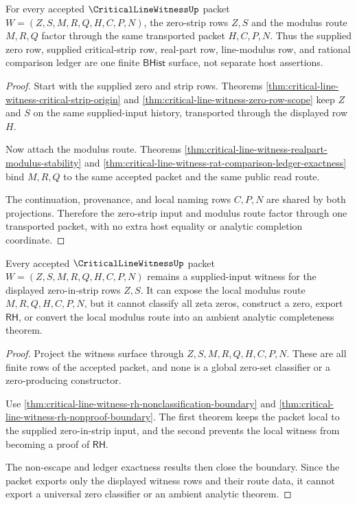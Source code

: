 \begin{theorem}
\label{thm:critical-line-witness-strip-modulus-route-factorization}
For every accepted $\CriticalLineWitnessUp$ packet $W=(Z,S,M,R,Q,H,C,P,N)$,
the zero-strip rows $Z,S$ and the modulus route $M,R,Q$ factor through the
same transported packet $H,C,P,N$. Thus the supplied zero row, supplied
critical-strip row, real-part row, line-modulus row, and rational comparison
ledger are one finite $\mathsf{BHist}$ surface, not separate host assertions.
\end{theorem}
\begin{proof}
Start with the supplied zero and strip rows. Theorems
\autoref{thm:critical-line-witness-critical-strip-origin} and
\autoref{thm:critical-line-witness-zero-row-scope} keep $Z$ and $S$ on the
same supplied-input history, transported through the displayed row $H$.

Now attach the modulus route. Theorems
\autoref{thm:critical-line-witness-realpart-modulus-stability} and
\autoref{thm:critical-line-witness-rat-comparison-ledger-exactness} bind
$M,R,Q$ to the same accepted packet and the same public read route.

The continuation, provenance, and local naming rows $C,P,N$ are shared by
both projections. Therefore the zero-strip input and modulus route factor
through one transported packet, with no extra host equality or analytic
completion coordinate.
\end{proof}

\begin{theorem}
\label{thm:critical-line-witness-local-rh-boundary}
Every accepted $\CriticalLineWitnessUp$ packet $W=(Z,S,M,R,Q,H,C,P,N)$ remains
a supplied-input witness for the displayed zero-in-strip rows $Z,S$. It can
expose the local modulus route $M,R,Q,H,C,P,N$, but it cannot classify all
zeta zeros, construct a zero, export $\mathsf{RH}$, or convert the local
modulus route into an ambient analytic completeness theorem.
\end{theorem}
\begin{proof}
Project the witness surface through $Z,S,M,R,Q,H,C,P,N$. These are all finite
rows of the accepted packet, and none is a global zero-set classifier or a
zero-producing constructor.

Use \autoref{thm:critical-line-witness-rh-nonclassification-boundary} and
\autoref{thm:critical-line-witness-rh-nonproof-boundary}. The first theorem
keeps the packet local to the supplied zero-in-strip input, and the second
prevents the local witness from becoming a proof of $\mathsf{RH}$.

The non-escape and ledger exactness results then close the boundary. Since
the packet exports only the displayed witness rows and their route data, it
cannot export a universal zero classifier or an ambient analytic theorem.
\end{proof}

